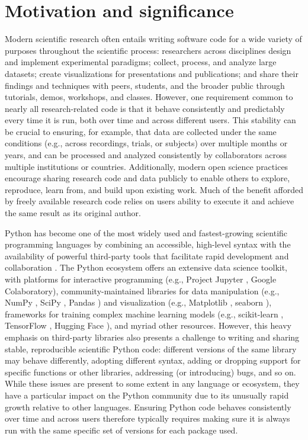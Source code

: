\documentclass[preprint,12pt, a4paper]{elsarticle}
\begin{document}
\section{Motivation and significance}
Modern scientific research often entails writing software code for a wide variety of purposes throughout the scientific process:
researchers across disciplines design and implement experimental paradigms; collect, process, and analyze large datasets; create visualizations for presentations and publications; and share their findings and techniques with peers, students, and the broader public through tutorials, demos, workshops, and classes.
However, one requirement common to nearly all research-related code is that it behave consistently and predictably every time it is run, both over time and across different users.
This stability can be crucial to ensuring, for example, that data are collected under the same conditions (e.g., across recordings, trials, or subjects) over multiple months or years, and can be processed and analyzed consistently by collaborators across multiple institutions or countries.
Additionally, modern open science practices encourage sharing research code and data publicly to enable others to explore, reproduce, learn from, and build upon existing work.
Much of the benefit afforded by freely available research code relies on users ability to execute it and achieve the same result as its original author.


Python has become one of the most widely used and fastest-growing scientific programming languages by combining an accessible, high-level syntax with the availability of powerful third-party tools that facilitate rapid development and collaboration \cite{MullEtal15}. 
The Python ecosystem offers an extensive data science toolkit, with platforms for interactive programming (e.g., Project Jupyter \cite{KluyEtal16}, Google Colaboratory), community-maintained libraries for data manipulation (e.g., NumPy \cite{HarrEtal20}, SciPy \cite{VirtEtal20}, Pandas \cite{McKi10}) and visualization (e.g., Matplotlib \cite{Hunt07}, seaborn \cite{Wask21}), frameworks for training complex machine learning models (e.g., scikit-learn \cite{PedrEtal11}, TensorFlow \cite{AbadEtal15}, Hugging Face \cite{WolfEtal20}), and myriad other resources. 
However, this heavy emphasis on third-party libraries also presents a challenge to writing and sharing stable, reproducible scientific Python code: different versions of the same library may behave differently, adopting different syntax, adding or dropping support for specific functions or other libraries, addressing (or introducing) bugs, and so on. 
While these issues are present to some extent in any language or ecosystem, they have a particular impact on the Python community due to its unusually rapid growth relative to other languages. 
Ensuring Python code behaves consistently over time and across users therefore typically requires making sure it is always run with the same specific set of versions for each package used. 
\end{document}
